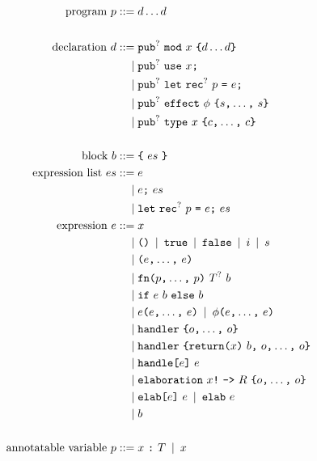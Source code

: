 \begin{figure}[p]
\begin{align*}
    \text{program}\ p
        \IS & d \dots d\\
    \\
    \text{declaration}\ d
        \IS & \opt{\tok{pub}}\ \tok{mod}\ x\ \tok{\{} \rep{d} \tok{\}}\\
        \OR & \opt{\tok{pub}}\ \tok{use}\ x\tok{;}\\
        \OR & \opt{\tok{pub}}\ \tok{let}\ \opt{\tok{rec}}\ p\ \tok{=}\ e\tok{;}\\
        \OR & \opt{\tok{pub}}\ \tok{effect}\ \phi\ \tok{\{} \csep{s} \tok{\}}\\
        \OR & \opt{\tok{pub}}\ \tok{type}\ x\ \tok{\{} \csep{c} \tok{\}}\\
    \\
    \text{block}\ b
        \IS & \tok{\{}\ es\ \tok{\}}\\
    \text{expression list}\ es
        \IS & e\\
        \OR & e\tok{;}\ es\\
        \OR & \tok{let}\ \opt{\tok{rec}}\ p\ \tok{=}\ e\tok{;}\ es\\
    \text{expression}\ e
        \IS & x\\
        \OR & \tok{()} \OR \tok{true} \OR \tok{false} \OR i \OR s \\
        \OR & \tok{(} \csep{e} \tok{)} \\
        \OR & \tok{fn} \tok{(} \csep{p} \kw{)}\ \opt{T}\ b \\
        \OR & \tok{if}\ e\ b\ \tok{else}\ b\\
        \OR & e\tok{(} \csep{e} \tok{)} \OR \phi\tok{(} \csep{e} \tok{)} \\
        \OR & \tok{handler}\ \tok{\{} \csep{o} \tok{\}}\\
        \OR & \tok{handler}\ \tok{\{} \tok{return} \tok{(}x\tok{)}\ b \tok{,}\ \csep{o} \tok{\}}\\
        \OR & \tok{handle}\tok{[}e\tok{]}\ e \\
        \OR & \tok{elaboration}\ x\tok{!}\ \tok{->}\ R\ \tok{\{} \csep{o} \tok{\}}\\
        \OR & \tok{elab}\tok{[} e \tok{]}\ e \OR \tok{elab}\ e \\
        \OR & b\\
    \\
    \text{annotatable variable}\ p
        \IS & x\ \tok{:}\ T \OR x\\

\end{align*}
\end{figure}
